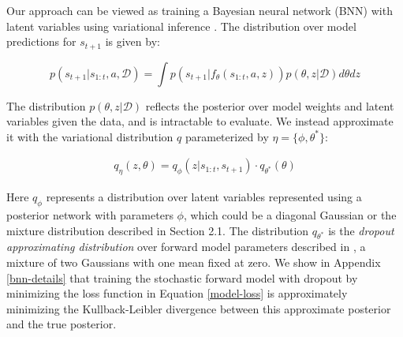 \documentclass{article} %
\begin{document}
Our \modelnamedrop approach can be viewed as training a Bayesian neural network (BNN) \citep{Neal1995} with latent variables using variational inference \citep{Jordan1999, VAE}. 
The distribution over model predictions for $s_{t+1}$ is given by:

\begin{equation*}
  p(s_{t+1} | s_{1:t}, a, \mathcal{D}) = \int p(s_{t+1} | f_\theta(s_{1:t}, a, z)) p(\theta, z | \mathcal{D}) d\theta dz
\end{equation*}

The distribution $p(\theta, z | \mathcal{D})$ reflects the posterior over model weights and latent variables given the data, and is intractable to evaluate.
We instead approximate it with the variational distribution $q$ parameterized by $\eta = \{\phi, \theta^*\}$:

\begin{align*}
  q_\eta(z, \theta) = q_\phi(z | s_{1:t}, s_{t+1}) \cdot q_{\theta^*}(\theta)
\end{align*}

Here $q_\phi$ represents a distribution over latent variables represented using a posterior network with parameters $\phi$, which could be a diagonal Gaussian or the mixture distribution described in Section 2.1.
The distribution $q_{\theta^*}$ is the \textit{dropout approximating distribution} over forward model parameters described in \citep{Gal16}, a mixture of two Gaussians with one mean fixed at zero.
We show in Appendix \ref{bnn-details} that training the stochastic forward model with dropout by minimizing the loss function in Equation \ref{model-loss} is approximately minimizing the Kullback-Leibler divergence between this approximate posterior and the true posterior.
\end{document}
